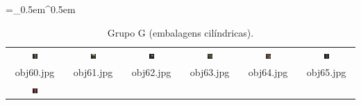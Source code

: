 \begin{table}[H]
  \centering
  \caption{Grupo G (embalagens cilíndricas).}
  \tabulinesep =_0.5em^0.5em
  \everyrow{\tabucline[0.4pt]-}
  \begin{tabu}{|cccccc|}
    \includegraphics[width=0.1\textwidth,height=0.1\textwidth]{imagens/coil_100/embalagens_cilindricas/obj7__0.png} &
    \includegraphics[width=0.1\textwidth,height=0.1\textwidth]{imagens/coil_100/embalagens_cilindricas/obj26__0.png} &
    \includegraphics[width=0.1\textwidth,height=0.1\textwidth]{imagens/coil_100/embalagens_cilindricas/obj26__0_1.png} &
    \includegraphics[width=0.1\textwidth,height=0.1\textwidth]{imagens/coil_100/embalagens_cilindricas/obj29__0.png} &
    \includegraphics[width=0.1\textwidth,height=0.1\textwidth]{imagens/coil_100/embalagens_cilindricas/obj32__0.png} &
    \includegraphics[width=0.1\textwidth,height=0.1\textwidth]{imagens/coil_100/embalagens_cilindricas/obj49__0.png}
    \\
    \scriptsize{obj60.jpg} & \scriptsize{obj61.jpg} & \scriptsize{obj62.jpg} &
    \scriptsize{obj63.jpg} & \scriptsize{obj64.jpg} & \scriptsize{obj65.jpg}
    \\
    \includegraphics[width=0.1\textwidth,height=0.1\textwidth]{imagens/coil_100/embalagens_cilindricas/obj62__80.png} &

\end{tabu}
\end{table}
